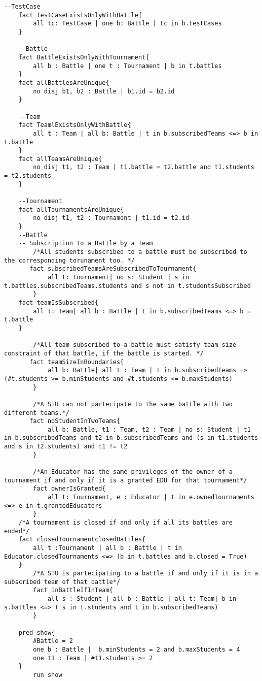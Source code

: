 \begin{lstlisting}[language=Alloy,  label={lst:alloycode}, basicstyle=\fontfamily{Roboto}\selectfont\ttfamily]
	--TestCase
	fact TestCaseExistsOnlyWithBattle{
		all tc: TestCase | one b: Battle | tc in b.testCases
	}
	
	--Battle 
	fact BattleExistsOnlyWithTournament{
		all b : Battle | one t : Tournament | b in t.battles
	}
	fact allBattlesAreUnique{
		no disj b1, b2 : Battle | b1.id = b2.id
	}
	
	--Team
	fact TeamlExistsOnlyWithBattle{
		all t : Team | all b: Battle | t in b.subscribedTeams <=> b in t.battle
	}
	fact allTeamsAreUnique{
		no disj t1, t2 : Team | t1.battle = t2.battle and t1.students = t2.students
	}

	--Tournament
	fact allTournamentsAreUnique{
		no disj t1, t2 : Tournament | t1.id = t2.id
	}
	--Battle
	-- Subscription to a Battle by a Team
        /*All students subscribed to a battle must be subscribed to the corresponding torunament too. */
       fact subscribedTeamsAreSubscribedToTournament{
            all t: Tournament| no s: Student | s in t.battles.subscribedTeams.students and s not in t.studentsSubscribed
        }
	fact teamIsSubscribed{
		all t: Team| all b : Battle | t in b.subscribedTeams <=> b = t.battle
	}

        /*All team subscribed to a battle must satisfy team size constraint of that battle, if the battle is started. */
       fact teamSizeInBoundaries{
            all b: Battle| all t : Team | t in b.subscribedTeams => (#t.students >= b.minStudents and #t.students <= b.maxStudents)
        }    

        /*A STU can not partecipate to the same battle with two different teams.*/
       fact noStudentInTwoTeams{
            all b: Battle, t1 : Team, t2 : Team | no s: Student | t1 in b.subscribedTeams and t2 in b.subscribedTeams and (s in t1.students and s in t2.students) and t1 != t2
        }
        
        /*An Educator has the same privileges of the owner of a tournament if and only if it is a granted EDU for that tournament*/
        fact ownerIsGranted{
            all t: Tournament, e : Educator | t in e.ownedTournaments <=> e in t.grantedEducators
        }
	/*A tournament is closed if and only if all its battles are ended*/
	fact closedTournamentclosedBattles{
		all t :Tournament | all b : Battle | t in Educator.closedTournaments <=> (b in t.battles and b.closed = True)
	}
        /*A STU is partecipating to a battle if and only if it is in a subscribed team of that battle*/
        fact inBattleIfInTeam{
            all s : Student | all b : Battle | all t: Team| b in s.battles <=> ( s in t.students and t in b.subscribedTeams)
        }
	
	pred show{
		#Battle = 2
		one b : Battle |  b.minStudents = 2 and b.maxStudents = 4
		one t1 : Team | #t1.students >= 2
	}
        run show

    \end{lstlisting}
